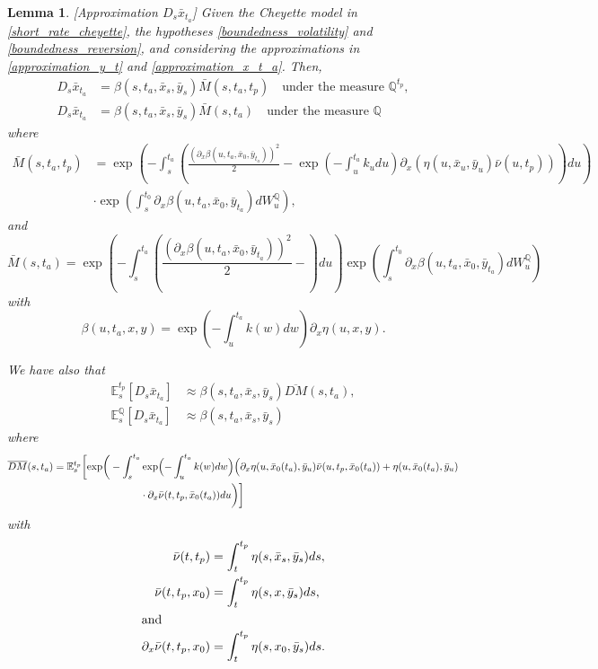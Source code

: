 \documentclass[a4paper,10pt]{article}
\newtheorem{lemma}[theorem]{Lemma}
\newcommand{\1}{\mathbf{1}}
\begin{document}
\begin{lemma}\label{DsX}[Approximation $D_s \bar{x}_{t_a}$]
Given the Cheyette model in \eqref{short_rate_cheyette}, the hypotheses \ref{boundedness_volatility} and \ref{boundedness_reversion}, and considering the approximations in \eqref{approximation_y_t} and \eqref{approximation_x_t_a}. Then, 
\begin{align}\label{approximation_D_s_x_t}
D_s \bar{x}_{t_a} &= \beta(s,t_a,\bar{x}_s,\bar{y}_s) \bar{M}(s,t_a,t_p) \quad \text{under the measure $\mathbb{Q}^{t_p}$}, \nonumber \\
D_s \bar{x}_{t_a} &= \beta(s,t_a,\bar{x}_s,\bar{y}_s) \bar{M}(s,t_a)  \quad \text{under the measure $\mathbb{Q}$}
\end{align}
where
\begin{align*}
\bar{M}(s,t_a,t_p) &= \exp\left(-\int_{s}^{t_a} \left( \frac{\left(\partial_x \beta(u,t_a,\bar{x}_0,\bar{y}_{t_a})\right)^{2}}{2} - \exp\left(-\int_{u}^{t_a}k_u du\right) \partial_x (\eta(u, \bar{x}_u, \bar{y}_{u}) \bar{\nu}(u,t_p))\right) du \right) \\ 
&\cdot\exp\left(\int_{s}^{t_0} \partial_x \beta(u,t_a,\bar{x}_0,\bar{y}_{t_a}) dW^{\mathbb{Q}}_u \right),
\end{align*}
and
\begin{equation*}
\bar{M}(s,t_a) = \exp\left(-\int_{s}^{t_a} \left( \frac{\left(\partial_x \beta(u,t_a,\bar{x}_0,\bar{y}_{t_a})\right)^{2}}{2} - \right) du \right) \exp\left(\int_{s}^{t_0} \partial_x \beta(u,t_a,\bar{x}_0,\bar{y}_{t_a}) dW^{\mathbb{Q}}_u \right)
\end{equation*} 
with 
\begin{equation*}
\beta(u,t_a,x,y) = \exp\left(-\int_{u}^{t_a}k(w) dw\right) \partial_x \eta(u,x,y).
\end{equation*} 

We have also that
\begin{align}\label{approsimation_E_s_x_t}
\mathbb{E}_s^{t_p}\left[D_s \bar{x}_{t_a}\right] &\approx \beta(s,t_a,\bar{x}_s,\bar{y}_s) \overline{DM}(s,t_a), \nonumber \\
\mathbb{E}_s^{\mathbb{Q}}\left[D_s \bar{x}_{t_a}\right]&\approx \beta(s,t_a,\bar{x}_s,\bar{y}_s)
\end{align}
where 
\begin{align*}
\overline{DM}(s,t_a) &= \mathbb{E}^{t_p}_s\biggl[\exp\biggr(-\int_{s}^{t_a} \exp\Bigl(-\int_{u}^{t_a}k(w) dw\Bigr) \Bigl(\partial_x \eta(u, \bar{x}_0(t_a), \bar{y}_{u}) \bar{\nu}(u,t_p, \bar{x}_0(t_a)) + \eta(u,\bar{x}_0(t_a), \bar{y}_{u}) \\
\qquad &\hspace{3cm} \cdot \partial_x \bar{\nu} (t,t_p, \bar{x}_0(t_a)) du\biggr)\biggr]
\end{align*}
with  
\begin{align*}
\bar{\nu}(t,t_p) &= \int_{t}^{t_p} \eta(s,\bar{x}_s,\bar{y}_s) ds, \\
\bar{\nu}(t,t_p, x_0) &= \int_{t}^{t_p} \eta(s,x,\bar{y}_s) ds,\\
\intertext{and}
\partial_x \bar{\nu}(t,t_p,x_0) &= \int_{t}^{t_p} \eta(s,x_0,\bar{y}_s) ds.
\end{align*}
\end{lemma}
\end{document}

